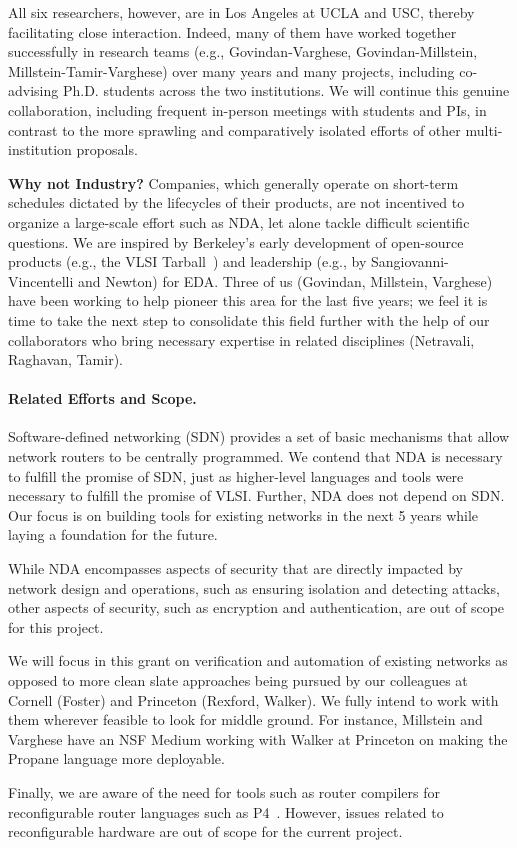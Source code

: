 All six researchers, however, are in Los Angeles at UCLA and USC, thereby facilitating close interaction. Indeed, many of them have worked together successfully in research teams (e.g., Govindan-Varghese, Govindan-Millstein, Millstein-Tamir-Varghese) over many years and many projects, including co-advising Ph.D. students across the two institutions. We will continue this genuine collaboration, including frequent in-person meetings with students and PIs, in contrast to the more sprawling and comparatively isolated efforts of other multi-institution proposals.

{\bf Why not Industry?} Companies, which generally operate on short-term schedules dictated by the lifecycles of their products, are not incentived to organize a large-scale effort such as NDA, let alone tackle difficult scientific questions. We are inspired by Berkeley's early development of open-source products (e.g., the VLSI Tarball~\cite{wikicite}) and leadership (e.g., by Sangiovanni-Vincentelli and Newton) for EDA.  Three of us (Govindan, Millstein, Varghese) have been working to help pioneer this area for the last five years; we feel it is time to take the next step to consolidate this field further with the help of our collaborators who bring necessary expertise in related disciplines (Netravali, Raghavan, Tamir). 

\paragraph*{Related Efforts and Scope.}
%
Software-defined networking (SDN) provides a set of basic mechanisms that allow network routers to be centrally programmed.  We contend that NDA is necessary to fulfill the promise of SDN, just as higher-level languages and tools were necessary to fulfill the promise of VLSI. Further, NDA does not depend on SDN. Our focus is on building tools for existing networks in the next 5 years while laying a foundation for the future.

While NDA encompasses aspects of security that are directly impacted by network design and operations, such as ensuring isolation and detecting attacks, other aspects of security, such as encryption and authentication, are out of scope for this project.

We will focus in this grant on verification and automation of
existing networks as opposed to more clean slate
approaches being pursued by our colleagues at Cornell (Foster) and Princeton (Rexford, Walker).  We fully intend to work with them wherever feasible to look for middle ground. For instance, Millstein and Varghese have an NSF Medium working with Walker at Princeton on making the Propane language more deployable. 

Finally, we are aware of the need for tools such as router compilers for reconfigurable router languages such as P4~\cite{P4}. However, issues related to reconfigurable hardware are out of scope for the current project.

